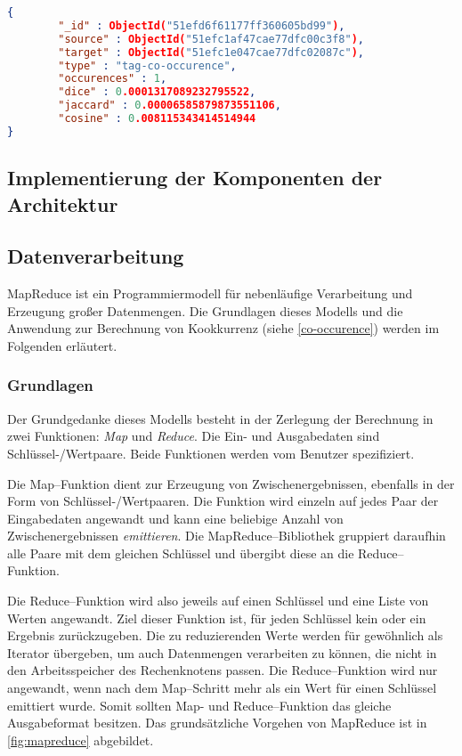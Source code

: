 \begin{lstlisting}[language=json, label={lst:edge_json}, caption={Kantendokument in JSON}]
{
        "_id" : ObjectId("51efd6f61177ff360605bd99"),
        "source" : ObjectId("51efc1af47cae77dfc00c3f8"),
        "target" : ObjectId("51efc1e047cae77dfc02087c"),
        "type" : "tag-co-occurence",
        "occurences" : 1,
        "dice" : 0.0001317089232795522,
        "jaccard" : 0.00006585879873551106,
        "cosine" : 0.008115343414514944
}
\end{lstlisting}

\subsection{Implementierung der Komponenten der Architektur}
\label{arch_components_impl}

\subsection{Datenverarbeitung}
\label{mapreduce}

MapReduce \cite{dg2004} ist ein Programmiermodell für nebenläufige Verarbeitung und Erzeugung großer Datenmengen. Die Grundlagen dieses Modells und die Anwendung zur Berechnung von Kookkurrenz (siehe \cref{co-occurence}) werden im Folgenden erläutert.

\subsubsection{Grundlagen}
\label{mapreduce_basic}

 Der Grundgedanke dieses Modells besteht in der Zerlegung der Berechnung in zwei Funktionen: \emph{Map} und \emph{Reduce}. Die Ein- und Ausgabedaten sind Schlüssel-/Wertpaare. Beide Funktionen werden vom Benutzer spezifiziert.

Die Map--Funktion dient zur Erzeugung von Zwischenergebnissen, ebenfalls in der Form von Schlüssel-/Wertpaaren. Die Funktion wird einzeln auf jedes Paar der Eingabedaten angewandt und kann eine beliebige Anzahl von Zwischenergebnissen \emph{emittieren}. Die MapReduce--Bibliothek gruppiert daraufhin alle Paare mit dem gleichen Schlüssel und übergibt diese an die Reduce--Funktion.

Die Reduce--Funktion wird also jeweils auf einen Schlüssel und eine Liste von Werten angewandt. Ziel dieser Funktion ist, für jeden Schlüssel kein oder ein Ergebnis zurückzugeben. Die zu reduzierenden Werte werden für gewöhnlich als Iterator übergeben, um auch Datenmengen verarbeiten zu können, die nicht in den Arbeitsspeicher des Rechenknotens passen. Die Reduce--Funktion wird nur angewandt, wenn nach dem Map--Schritt mehr als ein Wert für einen Schlüssel emittiert wurde. Somit sollten Map- und Reduce--Funktion das gleiche Ausgabeformat besitzen. Das grundsätzliche Vorgehen von MapReduce ist in \cref{fig:mapreduce} abgebildet.

